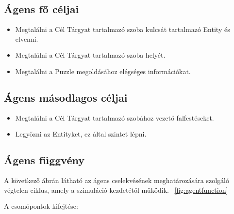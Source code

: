 \subsection{Ágens fő céljai}

\begin{itemize}
    \item Megtalálni a Cél Tárgyat tartalmazó szoba kulcsát tartalmazó Entity és elvenni.
    \item Megtalálni a Cél Tárgyat tartalmazó szoba helyét.
    \item Megtalálni a Puzzle megoldásához elégséges információkat.
\end{itemize}

\subsection{Ágens másodlagos céljai}

\begin{itemize}
    \item Megtalálni a Cél Tárgyat tartalmazó szobához vezető falfestéseket.
    \item Legyőzni az Entityket, ez által szintet lépni.
\end{itemize}

\subsection{Ágens függvény}

A következő ábrán látható az ágens cselekvésének meghatározására szolgáló végtelen ciklus, amely a szimuláció kezdetétől működik. ~\ref{fig:agentfunction}

\noindent A csomópontok kifejtése:

